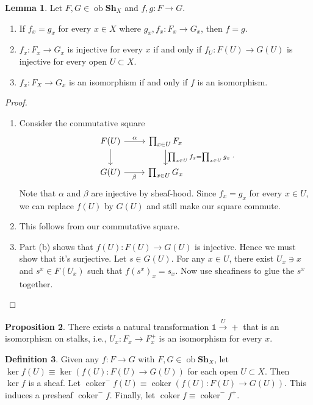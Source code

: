 \documentclass[10pt,letterpaper,cm]{nupset}
\theoremstyle{definition}
\newtheorem{definition}{Definition}[subsection]
\theoremstyle{theorem}
\newtheorem{lemma}[definition]{Lemma}
\newtheorem{prop}[definition]{Proposition}
\theoremstyle{remark}
\newcommand{\1}{\mathbb{1}}
\newcommand{\0}{\vec 0}
\DeclareMathOperator{\ob}{ob}
\DeclareMathOperator{\coker}{coker}
\begin{document}
\begin{lemma}
Let $F, G \in \ob{\mathbf{Sh}_{X}}$ and $f,g : F \to G$. 
\begin{enumerate}[label=(\alph*)]
\item If $f_x = g_x$ for every $x \in X$ where $g_x, f_x : F_x \to G_x$, then $f =g$.
\item $f_x : F_x \to G_x$ is injective for every $x$ if and only if $f_U : F(U) \to G(U)$ is injective for every open $U \subset X$.
\item $f_x : F_X \to G_x$ is an isomorphism if and only if $f$ is an isomorphism.
\end{enumerate}
\end{lemma}
\begin{proof} $ $
\begin{enumerate}[label=(\alph*)]
\item Consider the commutative square 
\[
\begin{tikzcd}
F(U) \arrow[r, "\alpha"] \arrow[d] & \prod_{x\in U}F_x \arrow[d, "\prod_{x \in U}f_x = \prod_{x \in U} g_x "] \\
G(U) \arrow[r, "\beta"']           & \prod_{x \in U} G_x                                                     
\end{tikzcd}
.\]  
Note that $\alpha$ and $\beta$ are injective by sheaf-hood. Since $f_x = g_x$ for every $x\in U$, we can replace $f(U)$ by $G(U)$ and still make our square commute.
\item This follows from our commutative square.
\item Part (b) shows that $f(U) : F(U) \to G(U)$ is injective. Hence we must show that it's surjective. Let $s \in G(U)$. For any $x \in U$, there exist $U_x \ni x$ and $s^x \in F(U_x)$ such that $f(s^x)_x = s_x$. Now use sheafiness to glue the $s^x$ together.
\end{enumerate}
\end{proof}

\begin{prop}
There exists a natural transformation  $\1 \overset{U}{\longrightarrow} +$ that is an isomorphism on stalks, i.e., $U_x : F_x \to F_x^{+}$ is an isomorphism for every $x$.
\end{prop}

\begin{definition}
Given any $f : F \to G$ with $F, G \in \ob{\mathbf{Sh}_{X}}$, let $\ker{f}(U) \equiv \ker(f(U) : F(U) \to G(U))$ for each open $U\subset X$. Then $\ker{f}$ is a sheaf. Let $\coker^{-}{f}(U) \equiv \coker(f(U) : F(U) \to G(U))$. This induces a presheaf $\coker^{-}{f}$. Finally, let $\coker{f} \equiv {\coker^{-}{f}}^{+}$.
\end{definition}
\end{document}

